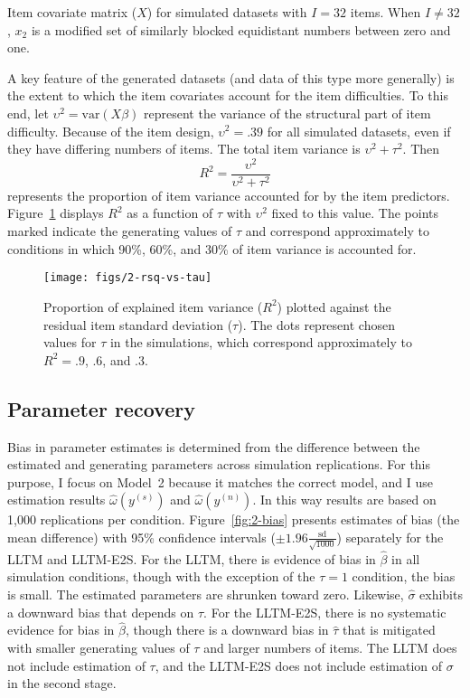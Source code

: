 \begin{table}
	\label{tab:2-X}
	\centering
	
	\caption{Item covariate matrix ($X$) for simulated datasets with $I = 32$ items. When $I \ne 32$, $x_2$ is a modified set of similarly blocked equidistant numbers between zero and one.}
\end{table}

A key feature of the generated datasets (and data of this type more generally) is the
extent to which the item covariates account for the item difficulties. To this end, let 
$\upsilon^2 = \mathrm{var}(X\beta)$ 
represent the variance of the structural part of item difficulty. Because of the item design, $\upsilon^2 = .39$ for all simulated datasets, even if they have differing numbers of items. The total item variance is 
$\upsilon^2 + \tau^2$. Then
\begin{equation} 
	R^2 = \frac{\upsilon^2}{\upsilon^2 + \tau^2}
\end{equation}
represents the proportion of item variance accounted for by the item predictors. Figure~\ref{fig:2-rsq-vs-tau} displays $R^2$ as a function of $\tau$ with $\upsilon^2$ fixed to this value. The points marked indicate the generating values of $\tau$ and correspond approximately to conditions in which 90\%, 60\%, and 30\% of item variance is accounted for.

\begin{figure}[tbp]
	\label{fig:2-rsq-vs-tau}
	\centering
	\texttt{[image: figs/2-rsq-vs-tau]}
	\caption{Proportion of explained item variance ($R^2$) plotted against the residual item standard deviation ($\tau$). The dots represent chosen values for $\tau$ in the simulations, which correspond approximately to $R^2 = .9$, .6, and .3.}
\end{figure}


\subsection{Parameter recovery}

Bias in parameter estimates is determined from the difference between the estimated and generating parameters across simulation replications. 
For this purpose, I focus on Model~2 because it matches the correct model, and I use estimation results $\hat \omega(y^{(s)})$ and $\hat \omega(y^{(n)})$. 
In this way results are based on 1,000 replications per condition. 
Figure~\ref{fig:2-bias} presents estimates of bias (the mean difference) with 95\% confidence intervals ($\pm 1.96 \frac{\mathrm{sd}}{\sqrt{1000}}$) separately for the LLTM and LLTM-E2S. 
For the LLTM, there is evidence of bias in $\hat \beta$ in all simulation conditions, though with the exception of the $\tau=1$ condition, the bias is small. 
The estimated parameters are shrunken toward zero.
Likewise, $\hat \sigma$ exhibits a downward bias that depends on $\tau$.
For the LLTM-E2S, there is no systematic evidence for bias in $\hat \beta$, though there is a downward bias in $\hat \tau$ that is mitigated with smaller generating values of $\tau$ and larger numbers of items.
The LLTM does not include estimation of $\tau$, and the LLTM-E2S does not include estimation of $\sigma$ in the second stage.

